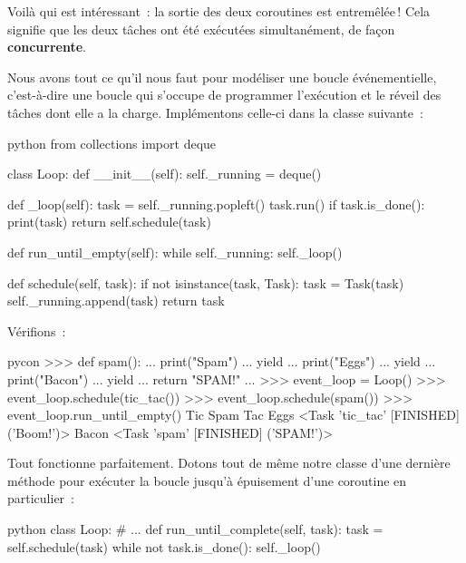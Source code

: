 \documentclass[small]{zmdocument}
\begin{document}
Voilà qui est intéressant : la sortie des deux coroutines est entremêlée !
Cela signifie que les deux tâches ont été exécutées simultanément, de façon
\textbf{concurrente}.



Nous avons tout ce qu’il nous faut pour modéliser une boucle événementielle,
c’est-à-dire une boucle qui s’occupe de programmer l’exécution et le réveil
des tâches dont elle a la charge. Implémentons celle-ci dans la classe 
suivante :



\begin{CodeBlock}{python}
from collections import deque

class Loop:
    def __init__(self):
        self._running = deque()

    def _loop(self):
        task = self._running.popleft()
        task.run()
        if task.is_done():
            print(task)
            return
        self.schedule(task)

    def run_until_empty(self):
        while self._running:
            self._loop()

    def schedule(self, task):
        if not isinstance(task, Task):
            task = Task(task)
        self._running.append(task)
        return task
\end{CodeBlock}



Vérifions :



\begin{CodeBlock}{pycon}
>>> def spam():
...     print("Spam")
...     yield
...     print("Eggs")
...     yield
...     print("Bacon")
...     yield
...     return "SPAM!"
...
>>> event_loop = Loop()
>>> event_loop.schedule(tic_tac())
>>> event_loop.schedule(spam())
>>> event_loop.run_until_empty()
Tic
Spam
Tac
Eggs
<Task 'tic_tac' [FINISHED] ('Boom!')>
Bacon
<Task 'spam' [FINISHED] ('SPAM!')>
\end{CodeBlock}



Tout fonctionne parfaitement. Dotons tout de même notre classe  d’une
dernière méthode pour exécuter la boucle jusqu’à épuisement d’une coroutine en
particulier :



\begin{CodeBlock}{python}
class Loop:
    # ...
    def run_until_complete(self, task):
        task = self.schedule(task)
        while not task.is_done():
            self._loop()
\end{CodeBlock}
\end{document}

